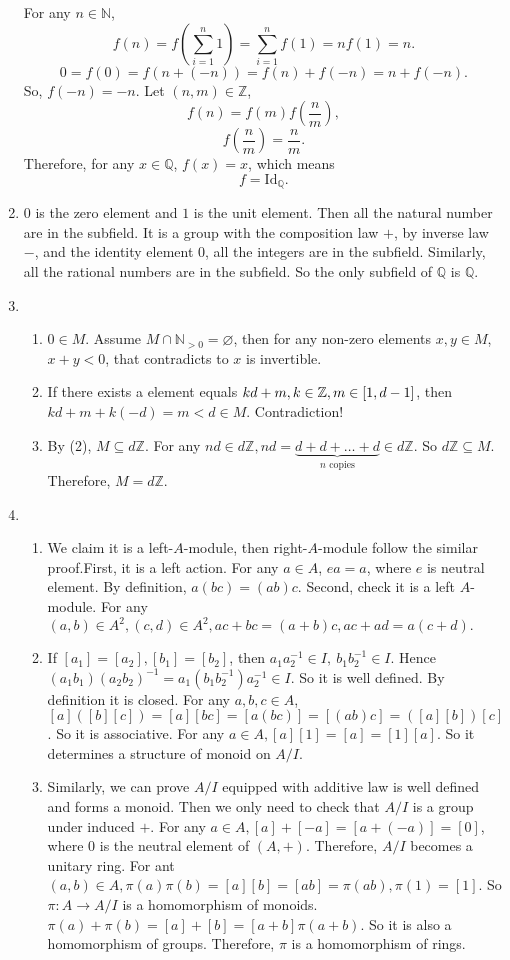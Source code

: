 \documentclass[12pt]{article}
\newcommand{\NN}{\mathbb{N}}
\newcommand{\ZZ}{\mathbb{Z}}
\newcommand{\QQ}{\mathbb{Q}}
\begin{document}
\begin{enumerate}
        For any $n\in\NN$, 
        $$f(n)=f\left(\sum_{i=1}^{n}1\right)=\sum_{i=1}^{n}f(1)=nf(1)=n.$$
        $$0=f(0)=f(n+(-n))=f(n)+f(-n)=n+f(-n).$$
        So, $f(-n)=-n$. Let $(n,m)\in \ZZ$,
        $$f(n)=f(m)f(\frac{n}{m}),$$
        $$f(\frac{n}{m})=\frac{n}{m}.$$
        Therefore, for any $x\in \QQ$, $f(x)=x$, which means 
        $$f=\mathrm{Id}_{\QQ}.$$
    \item  $0$ is the zero element and $1$ is the unit element. Then all the natural number are in the subfield. It is a group with the composition law $+$, by inverse law $-$, and the identity element $0$, all the integers are in the subfield. Similarly, all the rational numbers are in the subfield. So the only subfield of $\QQ$ is $\QQ$.
    \item 
        \begin{enumerate}
            \item $0\in M$. Assume $M\cap\NN_{>0}=\varnothing$, then for any non-zero elements $x,y\in M$, $x+y<0$, that contradicts to $x$ is invertible.
            \item If there exists a element equals $kd+m,k\in \ZZ,m\in\interval{1}{d-1} $, then $kd+m+k(-d)=m<d\in M$. Contradiction!
            \item By (2), $M\subseteq d\ZZ$. For any $nd\in d\ZZ, nd=\underset{n \text{ copies}}{\underbrace{d+d+\dots+d}}\in d\ZZ$. So $d\ZZ\subseteq M$. Therefore, $M=d\ZZ$.
        \end{enumerate}
    \setcounter{enumi}{8}
    \item 
        \begin{enumerate}
            \item We claim it is a left-$A$-module, then right-$A$-module follow the similar proof.First, it is a left action. For any $a\in A$, $ea=a$, where $e$ is neutral element. By definition, $a(bc)=(ab)c$. Second, check it is a left $A$-module. For any $(a,b)\in A^2, (c,d)\in A^2, ac+bc=(a+b)c, ac+ad=a(c+d).$
            \item If $[a_1]=[a_2],[b_1]=[b_2]$, then $a_1a_2^{-1}\in I,\ b_1b_2^{-1}\in I$. Hence $(a_1b_1)(a_2b_2)^{-1}=a_1(b_1b_2^{-1})a_2^{-1}\in I$. So it is well defined. 
            \newline
            By definition it is closed. For any $a,b,c\in A$, $[a]([b][c])=[a][bc]=[a(bc)]=[(ab)c]=([a][b])[c]$. So it is associative. For any $a\in A, [a][1]=[a]=[1][a]$. So it determines a structure of monoid on $A/I$.
            \item Similarly, we can prove $A/I$ equipped with additive law is well defined and forms a monoid. Then we only need to check that $A/I$ is a group under induced $+$. For any $a\in A, [a]+[-a]=[a+(-a)]=[0]$, where $0$ is the neutral element of $(A,+)$. Therefore, $A/I$ becomes a unitary ring. For ant $(a,b)\in A , \pi(a)\pi(b)=[a][b]=[ab]=\pi(ab), \pi(1)=[1]$. So $\pi:A\rightarrow A/I$ is a homomorphism of monoids. $\pi(a)+\pi(b)=[a]+[b]=[a+b]\pi(a+b).$ So it is also a homomorphism of groups. Therefore, $\pi$ is a homomorphism of rings.

\end{enumerate}
\end{enumerate}
\end{document}
